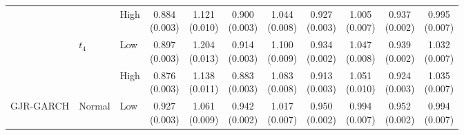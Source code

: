 \begin{table}[!t]
\begin{tabular}{lllcccccccc}
 &  & High & \shortstack{0.884\\[-1pt]\scriptsize(0.003)} & \shortstack{1.121\\[-1pt]\scriptsize(0.010)} & \shortstack{0.900\\[-1pt]\scriptsize(0.003)} & \shortstack{1.044\\[-1pt]\scriptsize(0.008)} & \shortstack{0.927\\[-1pt]\scriptsize(0.003)} & \shortstack{1.005\\[-1pt]\scriptsize(0.007)} & \shortstack{0.937\\[-1pt]\scriptsize(0.002)} & \shortstack{0.995\\[-1pt]\scriptsize(0.007)}\\
\addlinespace[1pt]
 & $t_4$ & Low & \shortstack{0.897\\[-1pt]\scriptsize(0.003)} & \shortstack{1.204\\[-1pt]\scriptsize(0.013)} & \shortstack{0.914\\[-1pt]\scriptsize(0.003)} & \shortstack{1.100\\[-1pt]\scriptsize(0.009)} & \shortstack{0.934\\[-1pt]\scriptsize(0.002)} & \shortstack{1.047\\[-1pt]\scriptsize(0.008)} & \shortstack{0.939\\[-1pt]\scriptsize(0.002)} & \shortstack{1.032\\[-1pt]\scriptsize(0.007)}\\
 &  & High & \shortstack{0.876\\[-1pt]\scriptsize(0.003)} & \shortstack{1.138\\[-1pt]\scriptsize(0.011)} & \shortstack{0.883\\[-1pt]\scriptsize(0.003)} & \shortstack{1.083\\[-1pt]\scriptsize(0.008)} & \shortstack{0.913\\[-1pt]\scriptsize(0.003)} & \shortstack{1.051\\[-1pt]\scriptsize(0.010)} & \shortstack{0.924\\[-1pt]\scriptsize(0.003)} & \shortstack{1.035\\[-1pt]\scriptsize(0.007)}\\
\addlinespace[1pt]
\midrule
GJR-GARCH & Normal & Low & \shortstack{0.927\\[-1pt]\scriptsize(0.003)} & \shortstack{1.061\\[-1pt]\scriptsize(0.009)} & \shortstack{0.942\\[-1pt]\scriptsize(0.002)} & \shortstack{1.017\\[-1pt]\scriptsize(0.007)} & \shortstack{0.950\\[-1pt]\scriptsize(0.002)} & \shortstack{0.994\\[-1pt]\scriptsize(0.007)} & \shortstack{0.952\\[-1pt]\scriptsize(0.002)} & \shortstack{0.994\\[-1pt]\scriptsize(0.007)}\\

\end{tabular}
\end{table}
